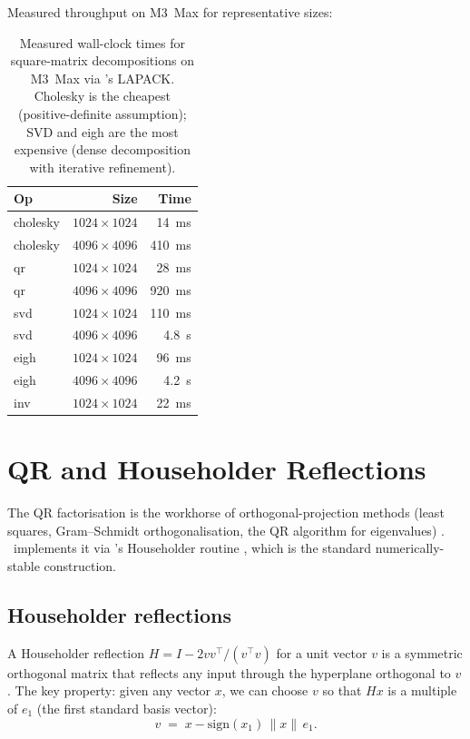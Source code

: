 Measured throughput on M3~Max for representative sizes:

\begin{table}[t]
\centering
\small
\begin{tabular}{lrr}
\toprule
Op & Size & Time \\
\midrule
cholesky & $1024 \times 1024$  & 14~ms \\
cholesky & $4096 \times 4096$  & 410~ms \\
qr       & $1024 \times 1024$  & 28~ms \\
qr       & $4096 \times 4096$  & 920~ms \\
svd      & $1024 \times 1024$  & 110~ms \\
svd      & $4096 \times 4096$  & 4.8~s \\
eigh     & $1024 \times 1024$  & 96~ms \\
eigh     & $4096 \times 4096$  & 4.2~s \\
inv      & $1024 \times 1024$  & 22~ms \\
\bottomrule
\end{tabular}
\caption[Linalg throughput on M3~Max.]{Measured wall-clock times
for square-matrix decompositions on M3~Max via \Accelerate's
LAPACK. Cholesky is the cheapest (positive-definite assumption);
SVD and eigh are the most expensive (dense decomposition with
iterative refinement).}
\label{tab:linalg:perf}
\end{table}

\section{QR and Householder Reflections}
\label{sec:linalg:qr_detail}

The QR factorisation is the workhorse of orthogonal-projection
methods (least squares, Gram--Schmidt orthogonalisation, the QR
algorithm for eigenvalues) \cite{golub_van_loan_2013,trefethen_bau_1997}.
\Lucid\ implements it via \Accelerate's Householder routine
 \cite{householder_1958}, which is the standard
numerically-stable construction.

\subsection{Householder reflections}
\label{ssec:linalg:householder}

A Householder reflection $H = I - 2 v v^\top / (v^\top v)$ for a
unit vector $v$ is a symmetric orthogonal matrix that reflects
any input through the hyperplane orthogonal to $v$. The key
property: given any vector $x$, we can choose $v$ so that $H x$
is a multiple of $e_1$ (the first standard basis vector):
\[
v \;=\; x - \mathrm{sign}(x_1)\,\|x\|\,e_1.
\]

